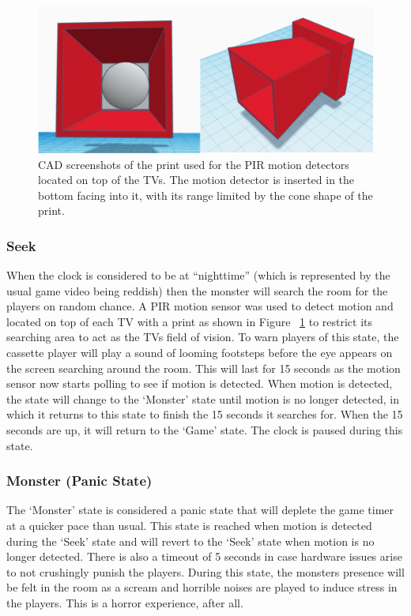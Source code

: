 \documentclass[conference]{IEEEtran}
\begin{document}
\begin{figure}[ht]
    \centering
    \includegraphics[width=0.90\columnwidth]{Images/PIR.png}
    \caption{CAD screenshots of the print used for the PIR motion detectors located on top of the TVs.
    The motion detector is inserted in the bottom facing into it, with its range limited by the cone shape of the print.}
    \label{fig:pir}
\end{figure}

\subsubsection{Seek}

\indent When the clock is considered to be at ``nighttime'' (which is represented by the usual game video being reddish) then the monster will search
the room for the players on random chance. A PIR motion sensor was used to detect motion and located on top of each TV with a print as shown in Figure ~\ref{fig:pir} to restrict its searching area to
act as the TVs field of vision. To warn players of this state, the cassette player will play a sound of looming footsteps before the eye appears on
the screen searching around the room. This will last for 15 seconds as the motion sensor now starts polling to see if motion is detected. When motion is
detected, the state will change to the `Monster' state until motion is no longer detected, in which it returns to this state to finish the 15 seconds it
searches for. When the 15 seconds are up, it will return to the `Game' state. The clock is paused during this state.


\subsubsection{Monster (Panic State)}

\indent The `Monster' state is considered a panic state that will deplete the game timer at a quicker pace than usual. This state is reached when motion
is detected during the `Seek' state and will revert to the `Seek' state when motion is no longer detected. There is also a timeout of 5 seconds in case
hardware issues arise to not crushingly punish the players. During this state, the monsters presence will be felt in the room as a scream and 
horrible noises are played to induce stress in the players. This is a horror experience, after all. 
\end{document}
